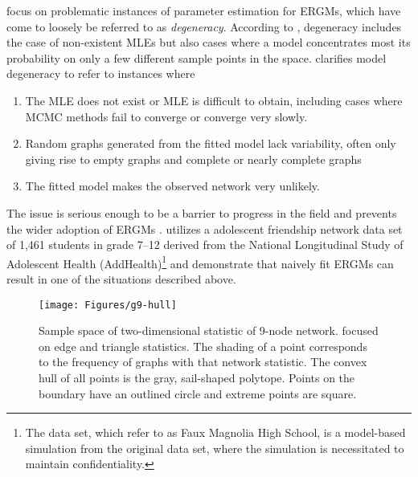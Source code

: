 \citet*{Handcock:degeneracy, Rinaldo:2009} focus on problematic instances of parameter 
estimation for ERGMs, which have come to loosely be referred 
to as \emph{degeneracy}.  
According to \citet{Handcock:degeneracy}, degeneracy includes the 
case of non-existent MLEs but also 
cases where a model concentrates most its probability on only a few different sample 
points in the space.  \citet{Rinaldo:2009} clarifies model degeneracy to refer 
to instances where
\begin{enumerate}
\item The MLE does not exist or   
 MLE is difficult to obtain, including cases where MCMC methods fail to converge
or converge very slowly.
\item Random graphs generated from the fitted model lack variability, often only 
giving rise to empty graphs and complete or nearly complete graphs
\item The fitted model makes the observed network very unlikely.
\end{enumerate}

%
The issue is serious enough to be a barrier to progress in the field and 
prevents the wider adoption of ERGMs \citep{advancesp*}.  
\citet{statnet-tutorial} utilizes a adolescent friendship network data set 
of 1,461 students in grade 7--12 derived from the National Longitudinal Study of 
Adolescent Health (AddHealth)\footnote{The data set, which \citeauthor{statnet-tutorial} refer to as Faux 
Magnolia High School, is a model-based simulation from the original data set, where 
the simulation is necessitated to maintain confidentiality.
} and demonstrate that naively fit ERGMs can result in one of the
situations described above.

\begin{figure}[h]
\centering
\texttt{[image: Figures/g9-hull]}
\caption[Sample space of two-dimensional statistic of 9-node network]{Sample space 
of two-dimensional statistic of 9-node network.  \citet{Rinaldo:2009} focused
on edge and triangle statistics.  The shading of a point corresponds to 
the frequency of graphs with that network statistic.  
The convex hull of all points is the gray, sail-shaped polytope.  Points on the 
boundary have an outlined circle and extreme points are square.}
\label{F:g9-hull}
\end{figure}

